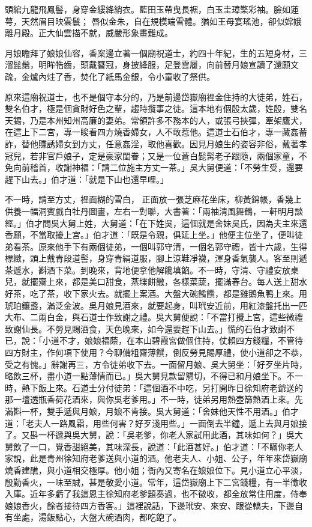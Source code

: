 \begin{showcontents}{}
頭綰九龍飛鳳髻，身穿金縷絳綃衣。藍田玉帶曳長裾，白玉圭璋檠彩袖。臉如蓮萼，天然眉目映雲鬟； 唇似金朱，自在規模端雪體。猶如王母宴瑤池，卻似嫦娥離月殿。正大仙雲描不就，威嚴形象畫難成。

月娘瞻拜了娘娘仙容，香案邊立著一個廟祝道士，約四十年紀，生的五短身材，三溜髭鬚，明眸牿齒，頭戴簪冠，身披絳服，足登雲履，向前替月娘宣讀了還願文疏，金爐內炷了香，焚化了紙馬金銀，令小童收了祭供。

原來這廟祝道士，也不是個守本分的，乃是前邊岱嶽廟裡金住持的大徒弟，姓石，雙名伯才，極是個貪財好色之輩，趨時攬事之徒。這本地有個殷太歲，姓殷，雙名天錫，乃是本州知州高廉的妻弟。常領許多不務本的人，或張弓挾彈，牽架鷹犬，在這上下二宮，專一睃看四方燒香婦女，人不敢惹他。這道士石伯才，專一藏姦蓄詐，替他賺誘婦女到方丈，任意姦淫，取他喜歡。因見月娘生的姿容非俗，戴著孝冠兒，若非官戶娘子，定是豪家閨眷；又是一位蒼白髭髯老子跟隨，兩個家童，不免向前稽首，收謝神福：「請二位施主方丈一茶。」吳大舅便道：「不勞生受，還要趕下山去。」伯才道：「就是下山也還早哩。」

不一時，請至方丈，裡面糊的雪白，
正面放一張芝麻花坐床，柳黃錦帳，香幾上供養一幅洞賓戲白牡丹圖畫，左右一對聯，大書著：「兩袖清風舞鶴，一軒明月談經。」伯才問吳大舅上姓，大舅道：「在下姓吳，這個就是舍妹吳氏，因為夫主來還香願，不當取擾上宮。」伯才道：「既是令親，俱延上坐。」他便主位坐了，便叫徒弟看茶。原來他手下有兩個徒弟，一個叫郭守清，一個名郭守禮，皆十六歲，生得標緻，頭上戴青段道髻，身穿青絹道服，腳上涼鞋凈襪，渾身香氣襲人。客至則遞茶遞水，斟酒下菜。到晚來，背地便拿他解饞填餡。不一時，守清、守禮安放桌兒，就擺齋上來，都是美口甜食，蒸堞餅饊，各樣菜蔬，擺滿春台。每人送上甜水好茶，吃了茶，收下家火去。就擺上案酒。大盤大碗餚饌，都是雞鵝魚鴨上來。用琥珀鑲盞，滿泛金波。吳月娘見酒來，就要起身，叫玳安近前，用紅漆盤托出一匹大布、二兩白金，與石道士作致謝之禮。吳大舅便說：「不當打攪上宮，這些微禮致謝仙長。不勞見賜酒食，天色晚來，如今還要趕下山去。」慌的石伯才致謝不已，說：「小道不才，娘娘福蔭，在本山碧霞宮做個住持，仗賴四方錢糧，不管待四方財主，作何項下使用？今聊備粗齋薄饌，倒反勞見賜厚禮，使小道卻之不恭，受之有愧。」辭謝再三，方令徒弟收下去。一面留月娘、吳大舅坐：「好歹坐片時，略飲三杯，盡小道一點薄情而已。」吳大舅見款留懇切，不得已和月娘坐下。不一時，熱下飯上來。石道士分付徒弟：「這個酒不中吃，另打開昨日徐知府老爺送的那一壇透瓶香荷花酒來，與你吳老爹用。」不一時，徒弟另用熱壺篩熱酒上來。先滿斟一杯，雙手遞與月娘，月娘不肯接。吳大舅道：「舍妹他天性不用酒。」伯才道：「老夫人一路風霜，用些何害？好歹淺用些。」一面倒去半鐘，遞上去與月娘接了。又斟一杯遞與吳大舅，說：「吳老爹，你老人家試用此酒，其味如何？」吳大舅飲了一口，覺香甜絕美，其味深長，說道：「此酒甚好。」伯才道：「不瞞你老人家說，此是青州徐知府老爹送與小道的酒。他老夫人、小姐、公子，年年來岱嶽廟燒香建醮，與小道相交極厚。他小姐；衙內又寄名在娘娘位下。見小道立心平淡，殷勤香火，一味至誠，甚是敬愛小道。常年，這岱嶽廟上下二宮錢糧，有一半徵收入庫。近年多虧了我這恩主徐知府老爹題奏過，也不徵收，都全放常住用度，侍奉娘娘香火，餘者接待四方香客。」這裡說話，下邊玳安、來安、跟從轎夫，下邊自有坐處，湯飯點心，大盤大碗酒肉，都吃飽了。


\end{showcontents}
